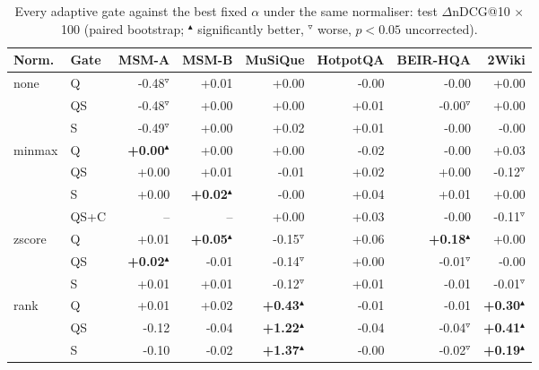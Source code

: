 \begin{table}[t]
\centering\small\setlength{\tabcolsep}{6pt}
\begin{tabular}{llrrrrrr}
\toprule
Norm. & Gate & MSM-A & MSM-B & MuSiQue & HotpotQA & BEIR-HQA & 2Wiki \\
\midrule
none & \textsc{Q} & -0.48$^{\triangledown}$ & +0.01 & +0.00 & -0.00 & -0.00 & +0.00 \\
 & \textsc{QS} & -0.48$^{\triangledown}$ & +0.00 & +0.00 & +0.01 & -0.00$^{\triangledown}$ & +0.00 \\
 & \textsc{S} & -0.49$^{\triangledown}$ & +0.00 & +0.02 & +0.01 & -0.00 & -0.00 \\
\midrule
minmax & \textsc{Q} & \textbf{+0.00$^{\blacktriangle}$} & +0.00 & +0.00 & -0.02 & -0.00 & +0.03 \\
 & \textsc{QS} & +0.00 & +0.01 & -0.01 & +0.02 & +0.00 & -0.12$^{\triangledown}$ \\
 & \textsc{S} & +0.00 & \textbf{+0.02$^{\blacktriangle}$} & -0.00 & +0.04 & +0.01 & +0.00 \\
 & \textsc{QS+C} & -- & -- & +0.00 & +0.03 & -0.00 & -0.11$^{\triangledown}$ \\
\midrule
zscore & \textsc{Q} & +0.01 & \textbf{+0.05$^{\blacktriangle}$} & -0.15$^{\triangledown}$ & +0.06 & \textbf{+0.18$^{\blacktriangle}$} & +0.00 \\
 & \textsc{QS} & \textbf{+0.02$^{\blacktriangle}$} & -0.01 & -0.14$^{\triangledown}$ & +0.00 & -0.01$^{\triangledown}$ & -0.00 \\
 & \textsc{S} & +0.01 & +0.01 & -0.12$^{\triangledown}$ & +0.01 & -0.01 & -0.01$^{\triangledown}$ \\
\midrule
rank & \textsc{Q} & +0.01 & +0.02 & \textbf{+0.43$^{\blacktriangle}$} & -0.01 & -0.01 & \textbf{+0.30$^{\blacktriangle}$} \\
 & \textsc{QS} & -0.12 & -0.04 & \textbf{+1.22$^{\blacktriangle}$} & -0.04 & -0.04$^{\triangledown}$ & \textbf{+0.41$^{\blacktriangle}$} \\
 & \textsc{S} & -0.10 & -0.02 & \textbf{+1.37$^{\blacktriangle}$} & -0.00 & -0.02$^{\triangledown}$ & \textbf{+0.19$^{\blacktriangle}$} \\
\bottomrule
\end{tabular}
\caption{Every adaptive gate against the best fixed $\alpha$ under the same normaliser: test $\Delta$nDCG@10 $\times$100 (paired bootstrap; $^{\blacktriangle}$ significantly better, $^{\triangledown}$ worse, $p<0.05$ uncorrected).}
\label{tab:grid}
\end{table}
